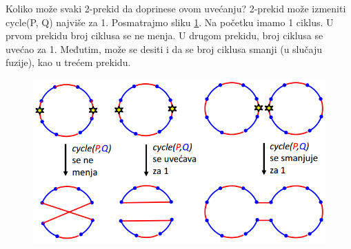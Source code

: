 Koliko može svaki 2-prekid da doprinese ovom uvećanju? 2-prekid može izmeniti cycle(P, Q) najviše za 1. Posmatrajmo sliku \ref{slika:prekidi}. Na početku imamo 1 ciklus. U prvom prekidu broj ciklusa se ne menja. U drugom prekidu, broj ciklusa se uvećao za 1. Međutim, može se desiti i da se broj ciklusa smanji (u slučaju fuzije), kao u trećem prekidu.

\begin{figure}[H]
\centering
\includegraphics[scale=0.5]{poglavlja/6/slike/izmena2prekidima.PNG}
\caption{}
\label{slika:prekidi}
\end{figure}

